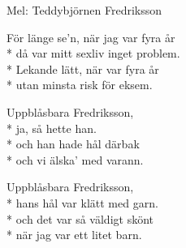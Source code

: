 \begin{SongText}
    \begin{SongInfo}
        Mel: Teddybjörnen Fredriksson
    \end{SongInfo}
    \begin{SongVerse}
        För länge se’n, när jag var fyra år\\*%
        då var mitt sexliv inget problem.\\*%
        Lekande lätt, när var fyra år\\*%
        utan minsta risk för eksem.
    \end{SongVerse}
    \begin{SongVerse}
        Uppblåsbara Fredriksson,\\*%
        ja, så hette han.\\*%
        och han hade hål därbak\\*%
        och vi älska’ med varann.
    \end{SongVerse}
    \begin{SongVerse}
        Uppblåsbara Fredriksson,\\*%
        hans hål var klätt med garn.\\*%
        och det var så väldigt skönt\\*%
        när jag var ett litet barn.
    \end{SongVerse}
\end{SongText}
